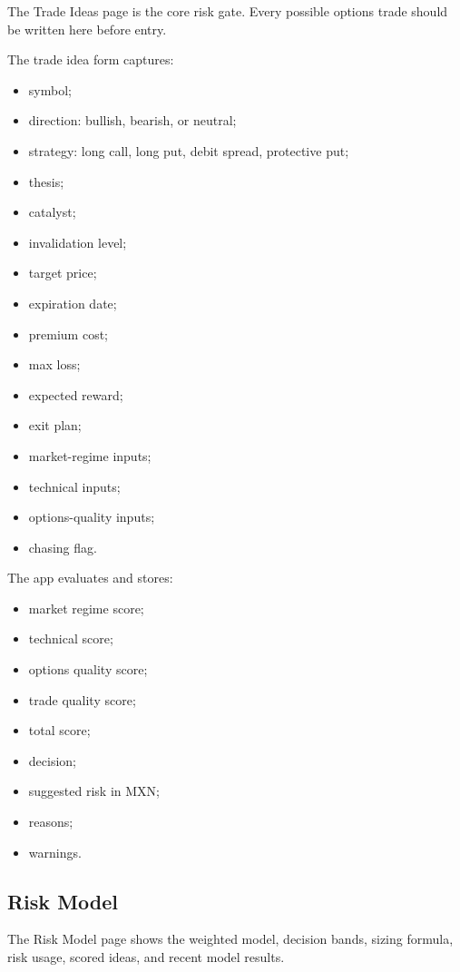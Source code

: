 \documentclass[11pt]{article}
\begin{document}
The Trade Ideas page is the core risk gate. Every possible options trade should be written here before entry.

The trade idea form captures:

\begin{itemize}[noitemsep]
  \item symbol;
  \item direction: bullish, bearish, or neutral;
  \item strategy: long call, long put, debit spread, protective put;
  \item thesis;
  \item catalyst;
  \item invalidation level;
  \item target price;
  \item expiration date;
  \item premium cost;
  \item max loss;
  \item expected reward;
  \item exit plan;
  \item market-regime inputs;
  \item technical inputs;
  \item options-quality inputs;
  \item chasing flag.
\end{itemize}

The app evaluates and stores:

\begin{itemize}[noitemsep]
  \item market regime score;
  \item technical score;
  \item options quality score;
  \item trade quality score;
  \item total score;
  \item decision;
  \item suggested risk in MXN;
  \item reasons;
  \item warnings.
\end{itemize}

\subsection{Risk Model}

The Risk Model page shows the weighted model, decision bands, sizing formula, risk usage, scored ideas, and recent model results.
\end{document}
